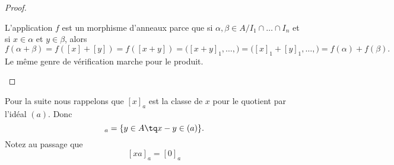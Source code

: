 \begin{proof}
\begin{subproof}
		\spitem[Morphisme]
		L'application \( f\) est un morphisme d'anneaux parce que si \( \alpha,\beta\in A/I_1\cap\ldots\cap I_n\) et si \( x\in \alpha\) et \( y\in \beta\), alors
		\begin{equation}
			f(\alpha+\beta)=f([x]+[y])=f([x+y])=\big( [x+y]_1,\ldots, \big)=\big( [x]_1+[y]_1,\ldots, \big)=f(\alpha)+f(\beta).
		\end{equation}
		Le même genre de vérification marche pour le produit.
	\end{subproof}
\end{proof}

Pour la suite nous rappelons que \( [x]_a\) est la classe de \( x\) pour le quotient par l'idéal \( (a)\). Donc
\begin{equation}
	[x]_a=\{ y\in A\tq x-y\in (a) \}.
\end{equation}
Notez au passage que
\begin{equation}		\label{EQooJAAQooJCcmVE}
	[xa]_a=[0]_a
\end{equation}



